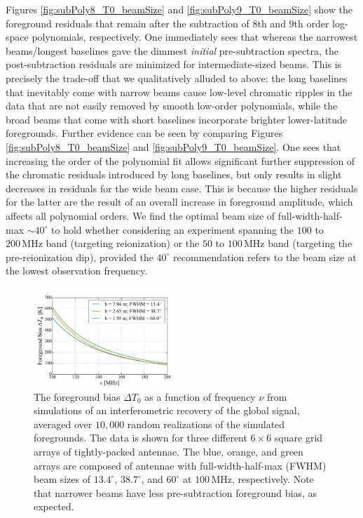 \documentclass[twocolumn,apj,numberedappendix]{emulateapj}
\newcommand{\acl}[1]{}
\begin{document}
\acl{Some trivial updates in the polynomial orders in this paragraph} Figures \ref{fig:subPoly8_T0_beamSize} and \ref{fig:subPoly9_T0_beamSize} show the foreground residuals that remain after the subtraction of $8$th and $9$th order log-space polynomials, respectively. One immediately sees that whereas the narrowest beams/longest baselines gave the dimmest \emph{initial} pre-subtraction spectra, the post-subtraction residuals are minimized for intermediate-sized beams. This is precisely the trade-off that we qualitatively alluded to above: the long baselines that inevitably come with narrow beams cause low-level chromatic ripples in the data that are not easily removed by smooth low-order polynomials, while the broad beams that come with short baselines incorporate brighter lower-latitude foregrounds. Further evidence can be seen by comparing Figures \ref{fig:subPoly8_T0_beamSize} and \ref{fig:subPoly9_T0_beamSize}. One sees that increasing the order of the polynomial fit allows significant further suppression of the chromatic residuals introduced by long baselines, but only results in slight decreases in residuals for the wide beam case. This is because the higher residuals for the latter are the result of an overall increase in foreground amplitude, which affects all polynomial orders. We find the optimal beam size of full-width-half-max $ \sim 40^\circ$ to hold whether considering an experiment spanning the $100$ to $200\,\textrm{MHz}$ band (targeting reionization) or the $50$ to $100\,\textrm{MHz}$ band (targeting the pre-reionization dip), provided the $ 40^\circ$ recommendation refers to the beam size at the lowest observation frequency.

\begin{figure}[h]
	\centering
	\includegraphics[width=0.50\textwidth] {figures/unsub_T0_beamSize.pdf}
	\caption{\acl{Changed figure and caption} The foreground bias $\Delta T_0$ as a function of frequency $\nu$ from simulations of an interferometric recovery of the global signal, averaged over $10,000$ random realizations of the simulated foregrounds. The data is shown for three different $6\times6$ square grid arrays of tightly-packed antennae. The blue, orange, and green arrays are composed of antennae with full-width-half-max (FWHM) beam sizes of $13.4^\circ$, $38.7^\circ$, and $60^\circ$ at $100\,\textrm{MHz}$, respectively. Note that narrower beams have less pre-subtraction foreground bias, as expected.}
	\label{fig:unsub_T0_beamSize}
\end{figure}
\end{document}
